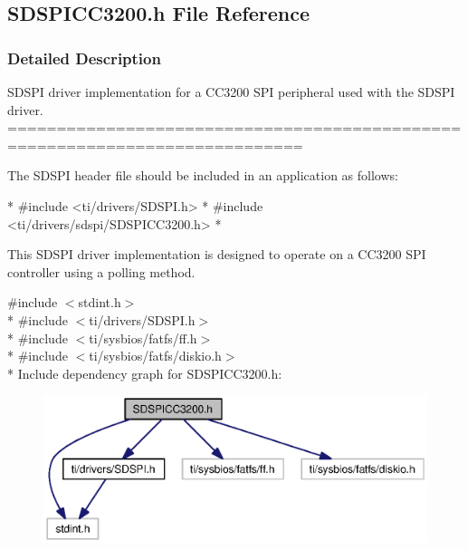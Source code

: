 \subsection{S\-D\-S\-P\-I\-C\-C3200.\-h File Reference}
\label{_s_d_s_p_i_c_c3200_8h}


\subsubsection{Detailed Description}
S\-D\-S\-P\-I driver implementation for a C\-C3200 S\-P\-I peripheral used with the S\-D\-S\-P\-I driver. ============================================================================

The S\-D\-S\-P\-I header file should be included in an application as follows\-: 
\begin{DoxyCode}
*  #include <ti/drivers/SDSPI.h>
*  #include <ti/drivers/sdspi/SDSPICC3200.h>
*  
\end{DoxyCode}


This S\-D\-S\-P\-I driver implementation is designed to operate on a C\-C3200 S\-P\-I controller using a polling method. 

{\ttfamily \#include $<$stdint.\-h$>$}\\*
{\ttfamily \#include $<$ti/drivers/\-S\-D\-S\-P\-I.\-h$>$}\\*
{\ttfamily \#include $<$ti/sysbios/fatfs/ff.\-h$>$}\\*
{\ttfamily \#include $<$ti/sysbios/fatfs/diskio.\-h$>$}\\*
Include dependency graph for S\-D\-S\-P\-I\-C\-C3200.\-h\-:
\nopagebreak
\begin{figure}[H]
\begin{center}
\leavevmode
\includegraphics[width=350pt]{_s_d_s_p_i_c_c3200_8h__incl}
\end{center}
\end{figure}

